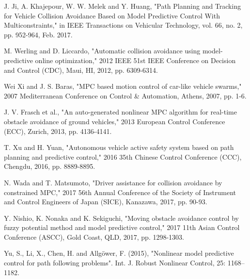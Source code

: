 \documentclass[11pt]{IEEEtran}
\begin{document}
\begin{thebibliography}{00}
	J. Ji, A. Khajepour, W. W. Melek and Y. Huang, "Path Planning and Tracking for Vehicle Collision Avoidance Based on Model Predictive Control With Multiconstraints," in IEEE Transactions on Vehicular Technology, vol. 66, no. 2, pp. 952-964, Feb. 2017.
	
	M. Werling and D. Liccardo, "Automatic collision avoidance using model-predictive online optimization," 2012 IEEE 51st IEEE Conference on Decision and Control (CDC), Maui, HI, 2012, pp. 6309-6314.
	
	Wei Xi and J. S. Baras, "MPC based motion control of car-like vehicle swarms," 2007 Mediterranean Conference on Control \& Automation, Athens, 2007, pp. 1-6.
	
	J. V. Frasch et al., "An auto-generated nonlinear MPC algorithm for real-time obstacle avoidance of ground vehicles," 2013 European Control Conference (ECC), Zurich, 2013, pp. 4136-4141.
	
	T. Xu and H. Yuan, "Autonomous vehicle active safety system based on path planning and predictive control," 2016 35th Chinese Control Conference (CCC), Chengdu, 2016, pp. 8889-8895.
	
	N. Wada and T. Matsumoto, "Driver assistance for collision avoidance by constrained MPC," 2017 56th Annual Conference of the Society of Instrument and Control Engineers of Japan (SICE), Kanazawa, 2017, pp. 90-93.
	
	Y. Nishio, K. Nonaka and K. Sekiguchi, "Moving obstacle avoidance control by fuzzy potential method and model predictive control," 2017 11th Asian Control Conference (ASCC), Gold Coast, QLD, 2017, pp. 1298-1303.
	
	Yu, S., Li, X., Chen, H. and Allgöwer, F. (2015), "Nonlinear model predictive control for path following problems". Int. J. Robust Nonlinear Control, 25: 1168–1182. 
\end{thebibliography}
\end{document}
